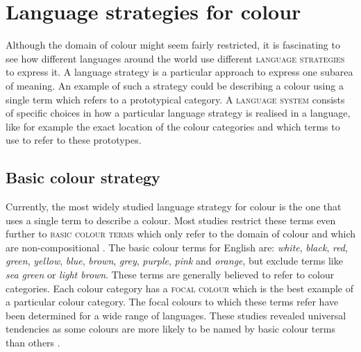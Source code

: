 \section{Language strategies for colour}
\label{s:strats-for-colour}

Although the domain of colour might seem fairly restricted, it is
fascinating to see how different languages around the world use
different \textsc{language strategies} to
express it. A language strategy is a particular approach to express
one subarea of meaning. An example of such a strategy could be
describing a colour using a single term which refers to a prototypical
category. A \textsc{language system} consists of
specific choices in how a particular language strategy is realised in
a language, like for example the exact location of the colour
categories and which terms to use to refer to these prototypes.

\subsection{Basic colour strategy}
\label{s:intro-basic-colour-strategy}

Currently, the most widely studied language strategy for colour is the
one that uses a single term to describe a colour. Most studies
restrict these terms even further to \textsc{basic colour
  terms} which only refer to the domain of
colour and which are non-compositional \citep{berlin69basic}. The
basic colour terms for English are: \textit{white}, \textit{black}, \textit{red},
\textit{green}, \textit{yellow}, \textit{blue}, \textit{brown}, \textit{grey}, \textit{purple},
\textit{pink} and \textit{orange}, but exclude terms like \textit{sea green} or
\textit{light brown}. These terms are generally believed to refer to colour
categories. Each colour category has a \textsc{focal colour} which is the best example of a particular colour
category. The focal colours to which these terms refer have been
determined for a wide range of languages. These studies revealed
universal tendencies as some colours are more likely to be named by
basic colour terms than others \citep{regier05focal}.

